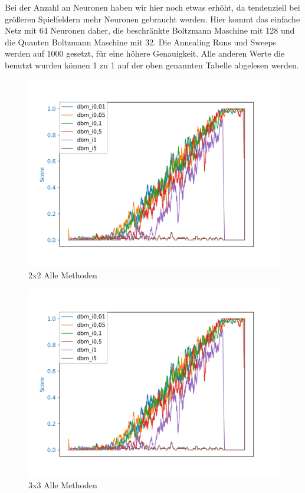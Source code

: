 Bei der Anzahl an Neuronen haben wir hier noch etwas erhöht, da tendenziell bei größeren Spielfeldern mehr Neuronen gebraucht werden. Hier kommt das einfache Netz mit 64 Neuronen daher, die beschränkte Boltzmann Maschine mit 128 und die Quanten Boltzmann Maschine mit 32. Die Annealing Runs und Sweeps werden auf 1000 gesetzt, für eine höhere Genauigkeit. Alle anderen Werte die benutzt wurden können 1 zu 1 auf der oben genannten Tabelle abgelesen werden.

\begin{figure}[H]
\centering
\includegraphics[width=\textwidth]{Figures/dbm9_4x4_dbm_i0,01_dbm_i0,05_dbm_i0,1_dbm_i0,5_dbm_i1_dbm_i5.png}
\caption{2x2 Alle Methoden}
\label{all_1}
\end{figure}

\begin{figure}[H]
\centering
\includegraphics[width=\textwidth]{Figures/dbm9_4x4_dbm_i0,01_dbm_i0,05_dbm_i0,1_dbm_i0,5_dbm_i1_dbm_i5.png}
\caption{3x3 Alle Methoden}
\label{all_2}
\end{figure}

